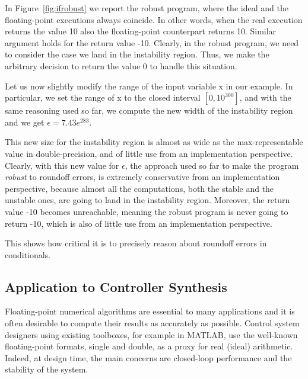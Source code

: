 In Figure~\ref{fig:ifrobust} we report the robust program, where the ideal and the floating-point executions always coincide. 
%
In other words, when the real execution returns the value 10 also the floating-point counterpart returns 10. Similar argument holds for the return value -10.
%
Clearly, in the robust program, we need to consider the case we land in the instability region. Thus, we make the arbitrary decision to return the value $0$ to handle this situation.

%

Let us now slightly modify the range of the input variable x in our example. 
%
In particular, we set the range of x to the closed interval $[0, 10^{300}]$, and with the same reasoning used so far, we compute the new width of the instability region and we get $\epsilon=7.43e^{283}$.
%

This new size for the instability region is almost as wide as the max-representable value in double-precision, and of little use from an implementation perspective. 
%
Clearly, with this new value for $\epsilon$, the approach used so far to make the program \emph{robust} to roundoff errors, is extremely conservative from an implementation perspective, because almost all the computations, both the stable and the unstable ones, are going to land in the instability region.
%
Moreover, the return value -10 becomes unreachable, meaning the robust program is never going to return -10, which is also of little use from an implementation perspective.
%
%

This shows how critical it is to precisely reason about roundoff errors in conditionals.
%
\subsection{Application to Controller Synthesis}
\label{controllers}
%
Floating-point numerical algorithms are essential to many applications and it is often desirable to compute their results as accurately as possible.
%
Control system designers using existing toolboxes, for example in MATLAB, use the well-known floating-point formats, single and double, as a proxy for real (ideal) arithmetic. 
%
Indeed, at design time, the main concerns are closed-loop performance and the stability of the system.
%

